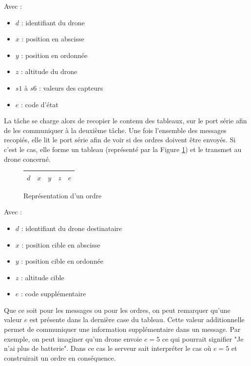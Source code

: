 \documentclass[a4paper,10pt]{report}
\begin{document}
	Avec :
	\begin{itemize}
	  \item $d$ : identifiant du drone
	  \item $x$ : position en abscisse
	  \item $y$ : position en ordonnée
	  \item $z$ : altitude du drone
	  \item $s1$ à $s6$ : valeurs des capteurs
	  \item $e$ : code d'état
	\end{itemize}

	La tâche se charge alors de recopier le contenu des tableaux, sur le 
port série afin de les communiquer à la deuxième tâche. Une fois l'ensemble des 
messages recopiés, elle lit le port série afin de voir si des ordres doivent 
être envoyés. Si c'est le cas, elle forme un tableau (représenté par la 
Figure \ref{message_serveur}) et le transmet au drone concerné.

	\begin{figure}
	  \begin{center}
	    \begin{tabular}{|c|c|c|c|c|}
	      \hline
	      $d$ & $x$ & $y$ & $z$ & $e$ \\
	      \hline
	    \end{tabular}
	  \end{center}
	  \caption{Représentation d'un ordre}
	  \label{message_serveur}
	\end{figure}
	
	Avec :
	\begin{itemize}
	  \item $d$ : identifiant du drone destinataire
	  \item $x$ : position cible en abscisse
	  \item $y$ : position cible en ordonnée
	  \item $z$ : altitude cible
	  \item $e$ : code supplémentaire
	\end{itemize}
	
	Que ce soit pour les messages ou pour les ordres, on peut remarquer 
qu'une valeur $e$ est présente dans la dernière case du tableau. Cette valeur 
additionnelle permet de communiquer une information supplémentaire dans un 
message. Par exemple, on peut imaginer qu'un drone envoie $e = 5$ ce qui 
pourrait signifier "Je n'ai plus de batterie". Dans ce cas le serveur sait 
interpréter le cas où $e = 5$ et construirait un ordre en conséquence.
\end{document}
